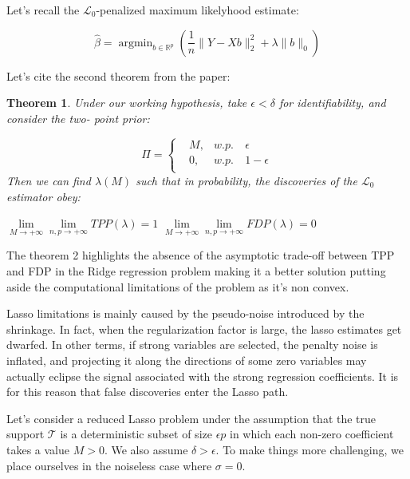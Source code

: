 \documentclass[10pt,onecolumn,letterpaper]{article}
\newtheorem{theorem}{Theorem}
\DeclareMathOperator*{\argmin}{argmin}
\begin{document}
Let's recall the $\mathcal{L}_0$-penalized maximum likelyhood estimate:

$$
\hat{\beta} = \argmin_{b \in \mathbb{R}^p} \left( \frac{1}{n}\lVert Y - Xb \rVert_2^2 + \lambda \lVert b \rVert_0 \right )
$$

Let's cite the second theorem from the paper:

\begin{theorem}
   Under our working hypothesis, take $\epsilon < \delta$ for identifiability, and consider the two- point prior:

   \begin{equation}
      \Pi = 
      \left\{
          \begin{aligned}
            &M,      &w.p. ~&\epsilon \\
            &0,      &w.p. ~& 1 - \epsilon \\
          \end{aligned}
        \right.
    \end{equation}
   Then we can find $\lambda(M)$ such that in probability, the discoveries of the $\mathcal{L}_0$ estimator obey:

   \begin{center}
      $\lim\limits_{M \rightarrow +\infty} \lim\limits_{n,p \rightarrow +\infty}  TPP(\lambda) = 1$
      $\lim\limits_{M \rightarrow +\infty} \lim\limits_{n,p \rightarrow +\infty}  FDP(\lambda) = 0$
      \end{center}


\end{theorem}

The theorem 2 highlights the absence of the asymptotic trade-off between TPP and FDP in the Ridge regression problem making it a better solution putting aside the computational limitations of the problem as it's non convex. 
\newline


Lasso limitations is mainly caused by the pseudo-noise introduced by the shrinkage. In fact, when the regularization factor is large, the lasso estimates get dwarfed. In other terms, if strong variables are selected, the penalty noise is inflated, and projecting it along the directions of some zero variables may actually eclipse the signal associated with the strong regression coefficients. It is for this reason that false discoveries enter the Lasso path.
\newline


Let's consider a reduced Lasso problem under the assumption that the true support $\mathcal{T}$ is a deterministic subset of size $\epsilon p$ in which each non-zero coefficient takes a value $M > 0$. We also assume $\delta > \epsilon$. To make things more challenging, we place ourselves in the noiseless case where $\sigma = 0$. 
\end{document}
